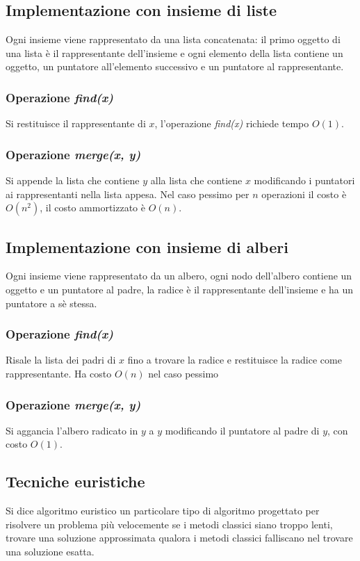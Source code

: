 \subsection{Implementazione con insieme di liste}
Ogni insieme viene rappresentato da una lista concatenata: il primo oggetto di una lista \`e il rappresentante dell'insieme e ogni elemento della lista contiene un oggetto, un puntatore all'elemento successivo e
un puntatore al rappresentante. 
\subsubsection{Operazione \emph{find(x)}}
Si restituisce il rappresentante di $x$, l'operazione \emph{find(x)} richiede tempo $O(1)$.
\subsubsection{Operazione \emph{merge(x, y)}}
Si appende la lista che contiene $y$ alla lista che contiene $x$ modificando i puntatori ai rappresentanti nella lista appesa. Nel caso pessimo per $n$ operazioni il costo \`e $O(n^2)$, il costo ammortizzato \`e
$O(n)$.
\subsection{Implementazione con insieme di alberi}
Ogni insieme viene rappresentato da un albero, ogni nodo dell'albero contiene un oggetto e un puntatore al padre, la radice \`e il rappresentante dell'insieme e ha un puntatore a s\`e stessa.
\subsubsection{Operazione \emph{find(x)}}
Risale la lista dei padri di $x$ fino a trovare la radice e restituisce la radice come rappresentante. Ha costo $O(n)$ nel caso pessimo
\subsubsection{Operazione \emph{merge(x, y)}}
Si aggancia l'albero radicato in $y$ a $y$ modificando il puntatore al padre di $y$, con costo $O(1)$.
\subsection{Tecniche euristiche}
Si dice algoritmo euristico un particolare tipo di algoritmo progettato per risolvere un problema pi\`u velocemente se i metodi classici siano troppo lenti, trovare una soluzione approssimata qualora i metodi 
classici falliscano nel trovare una soluzione esatta. 
